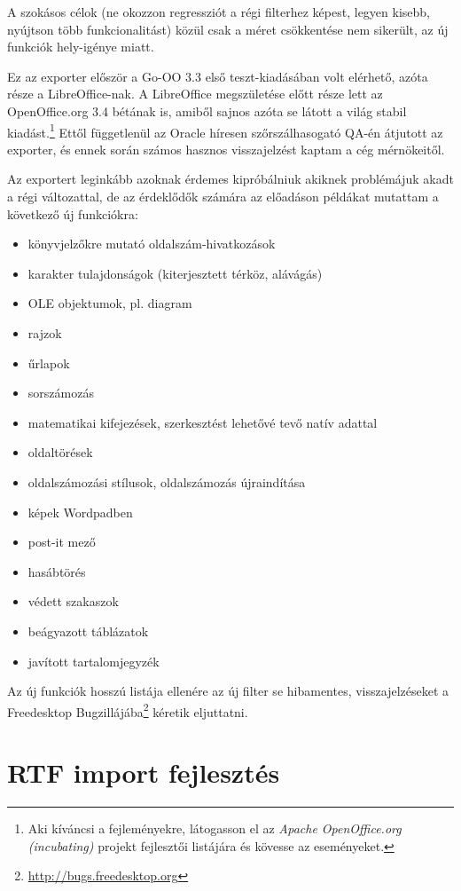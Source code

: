 \documentclass[a4paper]{report}
\begin{document}
A szokásos célok (ne okozzon regressziót a régi filterhez képest, legyen
kisebb, nyújtson több funkcionalitást) közül csak a méret csökkentése nem
sikerült, az új funkciók hely-igénye miatt.

Ez az exporter először a Go-OO 3.3 első teszt-kiadásában volt elérhető, azóta
része a LibreOffice-nak. A LibreOffice megszületése előtt része lett az
OpenOffice.org 3.4 bétának is, amiből sajnos azóta se látott a világ stabil
kiadást.\footnote{Aki kíváncsi a fejleményekre, látogasson el az \emph{Apache
OpenOffice.org (incubating)} projekt fejlesztői listájára és kövesse az
eseményeket.} Ettől függetlenül az Oracle híresen szőrszálhasogató QA-én
átjutott az exporter, és ennek során számos hasznos visszajelzést kaptam a cég
mérnökeitől.

Az exportert leginkább azoknak érdemes kipróbálniuk akiknek problémájuk akadt a
régi változattal, de az érdeklődők számára az előadáson példákat mutattam a
következő új funkciókra:

\begin{itemize}
\item könyvjelzőkre mutató oldalszám-hivatkozások
\item karakter tulajdonságok (kiterjesztett térköz, alávágás)
\item OLE objektumok, pl. diagram
\item rajzok
\item űrlapok
\item sorszámozás
\item matematikai kifejezések, szerkesztést lehetővé tevő natív adattal
\item oldaltörések
\item oldalszámozási stílusok, oldalszámozás újraindítása
\item képek Wordpadben
\item post-it mező
\item hasábtörés
\item védett szakaszok
\item beágyazott táblázatok
\item javított tartalomjegyzék
\end{itemize}

Az új funkciók hosszú listája ellenére az új filter se hibamentes,
visszajelzéseket a Freedesktop
Bugzillájába\footnote{\url{http://bugs.freedesktop.org}} kéretik eljuttatni.

\section{RTF import fejlesztés}
\end{document}
